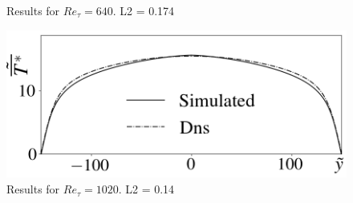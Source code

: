 \documentclass[xcolor=dvipsnames,8pt,aspectratio=34]{beamer}
\begin{document}
\begin{frame}
\begin{minipage}[h!]{0.45\textwidth}
\begin{figure}
				\caption{Results for $Re_\tau = 640$. L2 = 0.174}
			\end{figure}
			\begin{figure}
				\centering
				\includegraphics[angle=0, scale=0.18]{fotos_formatacao_final/Temperature_150_071_Prt0905_A26}
				\caption{Results for $Re_\tau = 1020$. L2 = 0.14}
			\end{figure}
		\end{minipage}		
		\end{frame}	
	
	
	
	
	
\end{document}
